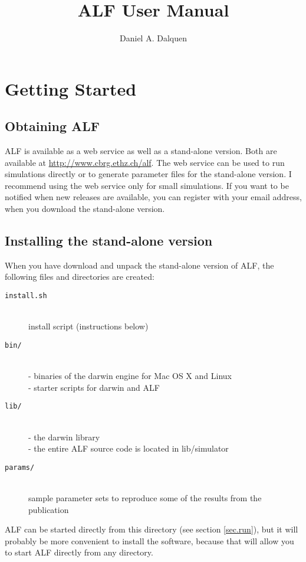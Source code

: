 \documentclass[11pt]{article}
\begin{document}

\nobibliography*

\title{ALF User Manual}
\author{Daniel A. Dalquen}
\maketitle

\section{Getting Started}
\subsection{Obtaining ALF}
ALF is available as a web service as well as a stand-alone version. Both are available at \url{http://www.cbrg.ethz.ch/alf}. The web service can be used to run simulations directly or to generate parameter files for the stand-alone version. I recommend using the web service only for small simulations. If you want to be notified when new releases are available, you can register with your email address, when you download the stand-alone version.

\subsection{Installing the stand-alone version}
When you have download and unpack the stand-alone version of ALF, the following
files and directories are created:

\begin{description}
\item[\texttt{install.sh}] \hfill \\
install script (instructions below)
\item[\texttt{bin/}] \hfill \\
       - binaries of the darwin engine for Mac OS X and Linux\hfill \\
	   - starter scripts for darwin and ALF
\item[\texttt{lib/}] \hfill \\
       - the darwin library\hfill \\
	   - the entire ALF source code is located in lib/simulator
\item[\texttt{params/}] \hfill \\
sample parameter sets to reproduce some of the results from the publication
\end{description}

ALF can be started directly from this directory (see section \ref{sec.run}), but it will probably be more convenient to install the software, because that will allow you to start ALF directly from any directory.
\end{document}
